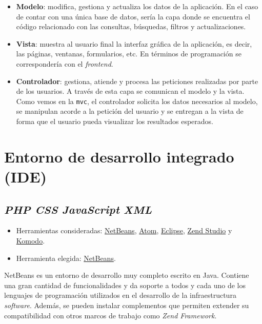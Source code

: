 \documentclass[
]{article}
\providecommand{\tightlist}{%
  \setlength{\itemsep}{0pt}\setlength{\parskip}{0pt}}
\begin{document}
\begin{itemize}
\tightlist
\item
  \textbf{Modelo}: modifica, gestiona y actualiza los datos de la
  aplicación. En el caso de contar con una única base de datos, sería la
  capa donde se encuentra el código relacionado con las consultas,
  búsquedas, filtros y actualizaciones.
\item
  \textbf{Vista}: muestra al usuario final la interfaz gráfica de la
  aplicación, es decir, las páginas, ventanas, formularios, etc. En
  términos de programación se correspondería con el \emph{frontend}.
\item
  \textbf{Controlador}: gestiona, atiende y procesa las peticiones
  realizadas por parte de los usuarios. A través de esta capa se
  comunican el modelo y la vista. Como vemos en la \texttt{mvc}, el
  controlador solicita los datos necesarios al modelo, se manipulan
  acorde a la petición del usuario y se entregan a la vista de forma que
  el usuario pueda visualizar los resultados esperados.
\end{itemize}

\hypertarget{entorno-de-desarrollo-integrado-ide}{%
\section{Entorno de desarrollo integrado
(IDE)}\label{entorno-de-desarrollo-integrado-ide}}

\hypertarget{php-css-javascript-xml}{%
\subsection{\texorpdfstring{\emph{PHP} \textbar{} \emph{CSS} \textbar{}
\emph{JavaScript} \textbar{}
\emph{XML}}{PHP \textbar{} CSS \textbar{} JavaScript \textbar{} XML}}\label{php-css-javascript-xml}}

\begin{itemize}
\tightlist
\item
  Herramientas consideradas: \href{https://netbeans.org/}{NetBeans},
  \href{https://atom.io/}{Atom}, \href{https://eclipse.org/}{Eclipse},
  \href{https://www.zend.com/products/zend-studio}{Zend Studio} y
  \href{https://www.activestate.com/products/komodo-ide/}{Komodo}.
\item
  Herramienta elegida: \href{https://netbeans.org/}{NetBeans}.
\end{itemize}

NetBeans es un entorno de desarrollo muy completo escrito en Java.
Contiene una gran cantidad de funcionalidades y da soporte a todos y
cada uno de los lenguajes de programación utilizados en el desarrollo de
la infraestructura \emph{software}. Además, se pueden instalar
complementos que permiten extender su compatibilidad con otros marcos de
trabajo como \emph{Zend Framework}.
\end{document}
